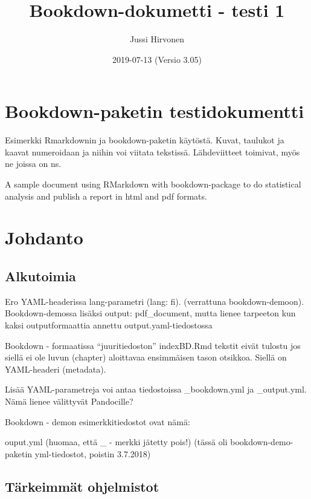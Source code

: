 \documentclass[finnish,]{book}
\title{Bookdown-dokumetti - testi 1}
\author{Jussi Hirvonen}
\date{2019-07-13 (Versio 3.05)}
\begin{document}
\maketitle

{
\setcounter{tocdepth}{1}
\tableofcontents
}
\hypertarget{bookdown-paketin-testidokumentti}{%
\chapter{Bookdown-paketin testidokumentti}\label{bookdown-paketin-testidokumentti}}

Esimerkki Rmarkdownin ja bookdown-paketin käytöstä. Kuvat, taulukot ja kaavat numeroidaan ja niihin voi viitata tekstissä. Lähdeviitteet toimivat, myös ne joissa on ns.

A sample document using RMarkdown with bookdown-package to do statistical analysis and publish a report in html and pdf formats.

\hypertarget{johdanto}{%
\chapter{Johdanto}\label{johdanto}}

\hypertarget{alkutoimia}{%
\section{Alkutoimia}\label{alkutoimia}}

Ero YAML-headerissa lang-parametri (lang: fi). (verrattuna bookdown-demoon).
Bookdown-demossa lisäksi output: pdf\_document, mutta lienee tarpeeton kun kaksi outputformaattia annettu output.yaml-tiedostossa

Bookdown - formaatissa ``juuritiedoston'' indexBD.Rmd tekstit eivät tulostu jos siellä ei ole luvun (chapter) aloittavaa ensimmäisen tason otsikkoa. Siellä on YAML-headeri (metadata).

Lisää YAML-parametreja voi antaa tiedostoissa \_bookdown.yml ja \_output.yml. Nämä lienee välittyvät Pandocille?

Bookdown - demon esimerkkitiedostot ovat nämä:

ouput.yml (huomaa, että \_ - merkki jätetty pois!) (tässä oli bookdown-demo-paketin yml-tiedostot, poistin 3.7.2018)

\hypertarget{tarkeimmat-ohjelmistot}{%
\section{Tärkeimmät ohjelmistot}\label{tarkeimmat-ohjelmistot}}
\end{document}
